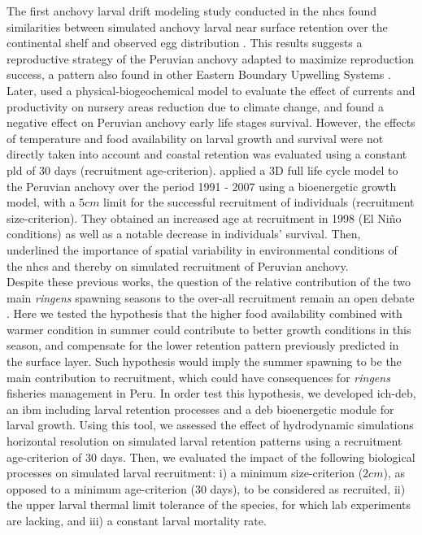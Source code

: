 The first anchovy larval drift modeling study conducted in the \acrshort{nhcs} found similarities between simulated anchovy larval near surface retention over the continental shelf and observed egg distribution \citep{BrocLett2008}. This results suggests a reproductive strategy of the Peruvian anchovy adapted to maximize reproduction success, a pattern also found in other Eastern Boundary Upwelling Systems \citep{BrocCola2009}. Later, \cite{BrocEche2013} used a physical-biogeochemical model to evaluate the effect of currents and productivity on nursery areas reduction due to climate change, and found a negative effect on Peruvian anchovy early life stages survival. However, the effects of temperature and food availability on larval growth and survival were not directly taken into account and coastal retention was evaluated using a constant \acrfull{pld} of $30$ days (recruitment age-criterion). \cite{XuChai2013} applied a 3D full life cycle model to the Peruvian anchovy over the period 1991 - 2007 using a bioenergetic growth model, with a $5cm$ limit for the successful recruitment of individuals (recruitment size-criterion). They obtained an increased age at recruitment in 1998 (El Ni\~{n}o conditions) as well as a notable decrease in individuals’ survival. Then, \cite{XuRose2015} underlined the importance of spatial variability in environmental conditions of the \acrshort{nhcs} and thereby on simulated recruitment of Peruvian anchovy.\\

Despite these previous works, the question of the relative contribution of the two main \textit{\gls{ringens}} spawning seasons to the over-all recruitment remain an open debate \citep{WalsWhit1980,PerePena2011}. Here we tested the hypothesis that the higher food availability combined with warmer condition in summer could contribute to better growth conditions in this season, and compensate for the lower retention pattern previously predicted in the surface layer. Such hypothesis would imply the summer spawning to be the main contribution to recruitment, which could have consequences for \textit{\gls{ringens}} fisheries management in Peru. In order test this hypothesis, we developed \gls{ich-deb}, an \acrfull{ibm} including larval retention processes \citep{LettVerl2008} and a \acrfull{deb} \citep{Kooi2009} bioenergetic module for larval growth. Using this tool, we assessed the effect of hydrodynamic simulations horizontal resolution on simulated larval retention patterns using a recruitment age-criterion of $30$ days. Then, we evaluated the impact of the following biological processes on simulated larval recruitment: i) a minimum size-criterion ($2 cm$), as opposed to a minimum age-criterion ($30$ days), to be considered as recruited, ii) the upper larval thermal limit tolerance of the species, for which lab experiments are lacking, and iii) a constant larval mortality rate.

